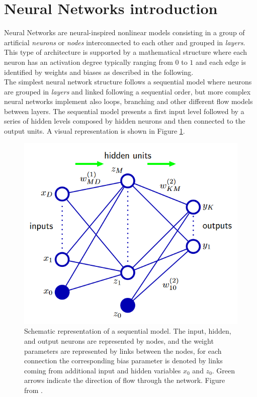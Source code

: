 \section{Neural Networks introduction}
Neural Networks are neural-inspired nonlinear models consisting in a group of artificial \textit{neurons} or \textit{nodes} interconnected to each other and grouped in \textit{layers}. This type of architecture is supported by a mathematical structure where each neuron has an activation degree typically ranging from $0$ to $1$ and each edge is identified by weights and biases as described in the following.\\

The simplest neural network structure follows a sequential model where neurons are grouped in \textit{layers} and linked following a sequential order, but more complex neural networks implement also loops, branching and other different flow models between layers.
The sequential model presents a first input level followed by a series of hidden levels composed by hidden neurons and then connected to the output units. A visual representation is shown in Figure \ref{fig:NN_art}.\\

\begin{figure}
	\centering
	\includegraphics[width=.6\textwidth]{IMG/Cap6/NN_art.png}
	\caption{Schematic representation of a sequential model. The input, hidden, and output neurons are represented by nodes, and the weight parameters are represented by links between the nodes, for each connection the corresponding bias parameter is denoted by links coming from additional input and hidden variables $x_0$ and $z_0$. Green arrows indicate the direction of flow through the network. Figure from \cite{NN_Bishop}.}
	\label{fig:NN_art}
\end{figure}


